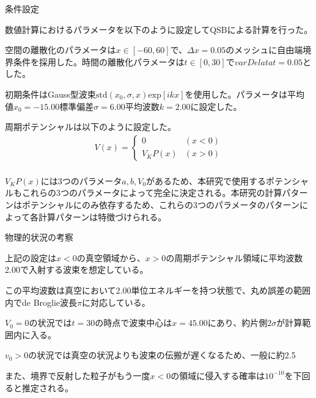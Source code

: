 \documentclass[a4paper, lualatex]{bxjsarticle}
\begin{document}
\begin{section}{条件設定}
    \par 数値計算におけるパラメータを以下のように設定してQSBによる計算を行った。
    \par 空間の離散化のパラメータは$x\in [-60, 60]$で、$\varDelta x=0.05$のメッシュに自由端境界条件を採用した。時間の離散化パラメータは$t\in [0, 30]$で$varDelata t=0.05$とした。
    \par 初期条件はGauss型波束$\mathrm{std}(x_0, \sigma, x)\mathrm{exp}[ikx]$を使用した。パラメータは平均値$x_0=-15.00$標準偏差$\sigma=6.00$平均波数$k=2.00$に設定した。
    \par 周期ポテンシャルは以下のように設定した。
    \begin{align}
     V(x)=\begin{cases}0&(x<0)\\V_KP(x)&(x>0)\end{cases}\nonumber\\
    \end{align}
    \par $V_KP(x)$には3つのパラメータ$a, b, V_0$があるため、本研究で使用するポテンシャルもこれらの3つのパラメータによって完全に決定される。本研究の計算パターンはポテンシャルにのみ依存するため、これらの3つのパラメータのパターンによって各計算パターンは特徴づけられる。
    \begin{subsection}{物理的状況の考察}
        \par 上記の設定は$x<0$の真空領域から、$x>0$の周期ポテンシャル領域に平均波数2.00で入射する波束を想定している。
        \par この平均波数は真空において2.00単位エネルギーを持つ状態で、丸め誤差の範囲内でde Broglie波長$\pi$に対応している。
        \par $V_0=0$の状況では$t=30$の時点で波束中心は$x=45.00$にあり、約片側$2\sigma$が計算範囲内に入る。
        \par $v_0>0$の状況では真空の状況よりも波束の伝搬が遅くなるため、一般に約2.5%
        \par また、境界で反射した粒子がもう一度$x<0$の領域に侵入する確率は$10^{-10}$を下回ると推定される。
    \end{subsection}
\end{section}
\end{document}

